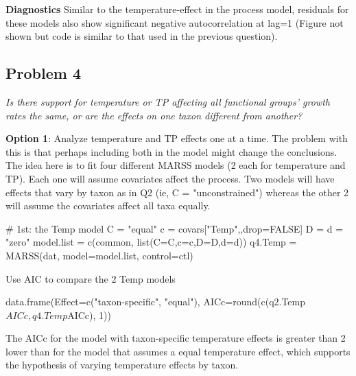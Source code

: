 {\bf Diagnostics} Similar to the temperature-effect in the process model, residuals for these models also show significant negative autocorrelation at lag=1 (Figure not shown but code is similar to that used in the previous question).


\clearpage

\subsection*{Problem 4}
\textit{Is there support for temperature or TP  affecting all functional groups' growth rates the same, or are the effects on one taxon different from another?}

\bigskip


{\bf Option 1}:  Analyze temperature and TP effects one at a time.  The problem with this is that perhaps including both in the model might change the conclusions.  The idea here is to fit four different MARSS models (2 each for temperature and TP).
Each one will assume covariates affect the process. Two models will have
effects that vary by taxon as in Q2 (ie, C = "unconstrained") whereas
the other 2 will assume the covariates affect all taxa equally.

\begin{Schunk}
\begin{Sinput}
 # 1st: the Temp model
 C = "equal"
 c = covars["Temp",,drop=FALSE]
 D = d = "zero"
 model.list = c(common, list(C=C,c=c,D=D,d=d))
 q4.Temp = MARSS(dat, model=model.list, control=ctl)
\end{Sinput}
\end{Schunk}
Use AIC to compare the 2 Temp models
\begin{Schunk}
\begin{Sinput}
 data.frame(Effect=c("taxon-specific", "equal"),
   	   AICc=round(c(q2.Temp$AICc, q4.Temp$AICc), 1))
\end{Sinput}
\end{Schunk}
The AICc for the model with taxon-specific temperature effects is greater than 2
lower than for the model that assumes a equal temperature effect, which
supports the hypothesis of varying temperature effects by taxon.

